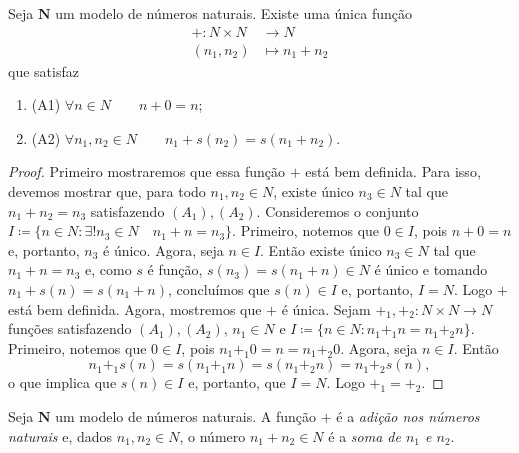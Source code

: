 \begin{teo}
	Seja $\bm N$ um modelo de números naturais. Existe uma única função
	\begin{align*}
	+: N \times N &\to N \\
			(n_1,n_2) &\mapsto n_1+n_2
	\end{align*}
que satisfaz
	\begin{enumerate}
	\item (A1) $\forall n \in N \qquad n + 0 = n$;
	\item (A2) $\forall n_1,n_2 \in N \qquad n_1 + s(n_2) = s(n_1+n_2)$.
	\end{enumerate}
\end{teo}
\begin{proof}
	Primeiro mostraremos que essa função $+$ está bem definida. Para isso, devemos mostrar que, para todo $n_1,n_2 \in N$, existe único $n_3 \in N$ tal que $n_1+n_2=n_3$ satisfazendo $(A_1),(A_2)$. Consideremos o conjunto $I \coloneqq \{n \in N : \exists! n_3 \in N \quad n_1+n=n_3\}$. Primeiro, notemos que $0 \in I$, pois $n+0=n$ e, portanto, $n_3$ é único. Agora, seja $n \in I$. Então existe único $n_3 \in N$ tal que $n_1+n=n_3$ e, como $s$ é função, $s(n_3)=s(n_1+n) \in N$ é único e tomando $n_1+s(n)=s(n_1+n)$, concluímos que $s(n) \in I$ e, portanto, $I=N$. Logo $+$ está bem definida. Agora, mostremos que $+$ é única. Sejam $+_1,+_2:N \times N \to N$ funções satisfazendo $(A_1),(A_2)$, $n_1 \in N$ e $I \coloneqq \{n \in N : n_1 +_1 n = n_1 +_2 n \}$. Primeiro, notemos que $0 \in I$, pois $n_1 +_1 0 =n = n_1 +_2 0$. Agora, seja $n \in I$. Então
	\begin{equation*}
	n_1 +_1 s(n) = s(n_1 +_1 n) = s(n_1 +_2 n) = n_1 +_2 s(n),
	\end{equation*}
o que implica que $s(n) \in I$ e, portanto, que $I=N$. Logo $+_1 = +_2$.
\end{proof}

\begin{defi}
	Seja $\bm N$ um modelo de números naturais. A função $+$ é a \emph{adição nos números naturais} e, dados $n_1,n_2 \in N$, o número $n_1 + n_2 \in N$ é a \emph{soma de $n_1$ e $n_2$}.
\end{defi}

